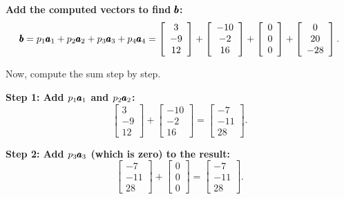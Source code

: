 \begin{solution}
    \textbf{Add the computed vectors to find $\pmb{b}$:}
    \[
    \pmb{b} = p_1 \pmb{a}_1 + p_2 \pmb{a}_2 + p_3 \pmb{a}_3 + p_4 \pmb{a}_4 = \left[\begin{array}{c}
    3 \\
    -9 \\
    12
    \end{array}\right] + \left[\begin{array}{c}
    -10 \\
    -2 \\
    16
    \end{array}\right] + \left[\begin{array}{c}
    0 \\
    0 \\
    0
    \end{array}\right] + \left[\begin{array}{c}
    0 \\
    20 \\
    -28
    \end{array}\right].
    \]
    
    Now, compute the sum step by step.
    
    \textbf{Step 1: Add $p_1 \pmb{a}_1$ and $p_2 \pmb{a}_2$:}
    \[
    \left[\begin{array}{c}
    3 \\
    -9 \\
    12
    \end{array}\right] + \left[\begin{array}{c}
    -10 \\
    -2 \\
    16
    \end{array}\right] = \left[\begin{array}{c}
    -7 \\
    -11 \\
    28
    \end{array}\right].
    \]
    
    \textbf{Step 2: Add $p_3 \pmb{a}_3$ (which is zero) to the result:}
    \[
    \left[\begin{array}{c}
    -7 \\
    -11 \\
    28
    \end{array}\right] + \left[\begin{array}{c}
    0 \\
    0 \\
    0
    \end{array}\right] = \left[\begin{array}{c}
    -7 \\
    -11 \\
    28
    \end{array}\right].
    \]
    

\end{solution}
